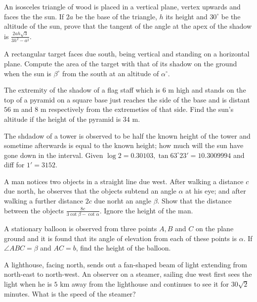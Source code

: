 \item An isosceles triangle of wood is placed in a vertical plane, vertex upwards and faces the the sun. If $2a$ be the base
  of the triangle, $h$ its height and $30^\circ$ be the altitude of the sun, prove that the tangent of the angle at
  the apex of the shadow is $\frac{2ah\sqrt{3}}{3h^2 - a^2}$.

\item A rectangular target faces due south, being vertical and standing on a horizontal plane. Compute the area of the target with
  that of its shadow on the ground when the sun is $\beta^\circ$ from the south at an altitude of $\alpha^\circ$.

\item The extremity of the shadow of a flag staff which is $6$ m high and stands on the top of a pyramid on a square base just
  reaches the side of the base and is distant $56$ m and $8$ m respectively from the extremeties of that side. Find
  the sun's altitude if the height of the pyramid is $34$ m.

\item The shdadow of a tower is observed to be half the known height of the tower and sometime afterwards is equal to the known
  height; how much will the sun have gone down in the interval. Given $\log 2 = 0.30103, \tan63^\circ23' = 10.3009994$ and
  diff for $1' = 3152$.

\item A man notices two objects in a straight line due west. After walking a distance $c$ due north, he observes that the
  objects subtend an angle $\alpha$ at his eye; and after walking a further distance $2c$ due norht an angle
  $\beta$. Show that the distance between the objects $\frac{8c}{3\cot\beta - \cot\alpha}$. Ignore the height of the
  man.

\item A stationary balloon is observed from three points $A, B$ and $C$ on the plane ground and it is found that its
  angle of elevation from each of these points is $\alpha$. If $\angle ABC = \beta$ and $AC = b$, find the
  height of the balloon.

\item A lighthouse, facing north, sends out a fan-shaped beam of light extending from north-east to north-west. An observer on a
  steamer, sailing due west first sees the light when he is $5$ km away from the lighthouse and continues to see it for
  $30\sqrt{2}$ minutes. What is the speed of the steamer?

